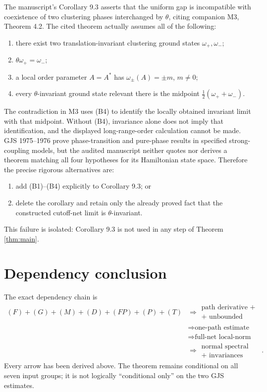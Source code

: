 \documentclass[11pt,a4paper]{article}
\begin{document}
The manuscript's Corollary 9.3 asserts that the uniform gap is incompatible with
coexistence of two clustering phases interchanged by $\theta$, citing companion M3,
Theorem 4.2.  The cited theorem actually assumes all of the following:

\begin{enumerate}[label=\textup{(B\arabic*)}]
\item there exist two translation-invariant clustering ground states
$\omega_+,\omega_-$;
\item $\theta\omega_+=\omega_-$;
\item a local order parameter $A=A^*$ has $\omega_\pm(A)=\pm m$, $m\ne0$;
\item every $\theta$-invariant ground state relevant there is the midpoint
$\tfrac12(\omega_++\omega_-)$.
\end{enumerate}

The contradiction in M3 uses (B4) to identify the locally obtained invariant limit with
that midpoint.  Without (B4), invariance alone does not imply that identification, and
the displayed long-range-order calculation cannot be made.  GJS 1975--1976 prove
phase-transition and pure-phase results in specified strong-coupling models, but the
audited manuscript neither quotes nor derives a theorem matching all four hypotheses for
its Hamiltonian state space.  Therefore the precise rigorous alternatives are:

\begin{enumerate}
\item add (B1)--(B4) explicitly to Corollary 9.3; or
\item delete the corollary and retain only the already proved fact that the constructed
cutoff-net limit is $\theta$-invariant.
\end{enumerate}

This failure is isolated: Corollary 9.3 is not used in any step of Theorem
\ref{thm:main}.

\section{Dependency conclusion}

The exact dependency chain is
\begin{align*}
 \boxed{(F)+(G)+(M)+(D)+(FP)+(P)+(T)}
 &\Longrightarrow
 \boxed{\begin{gathered}\text{path derivative + filter}\\
                         \text{+ unbounded clustering}\end{gathered}}\\
 &\Longrightarrow \boxed{\text{one-path estimate}}\\
 &\Longrightarrow \boxed{\text{full-net local-norm limit}}\\
 &\Longrightarrow
 \boxed{\begin{gathered}\text{normal spectral ground state}\\
                         \text{+ invariances}\end{gathered}}.
\end{align*}
Every arrow has been derived above.  The theorem remains conditional on all seven input groups;
it is not logically ``conditional only'' on the two GJS estimates.
\end{document}
